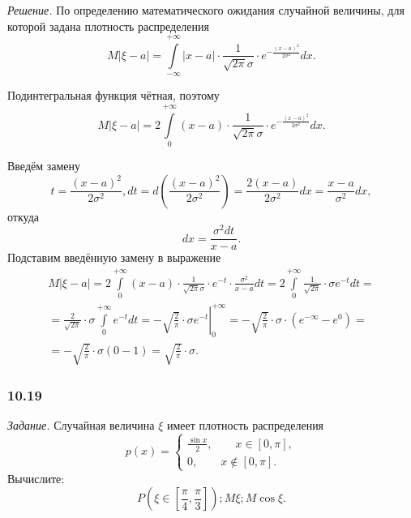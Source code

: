 \textit{Решение.} По определению математического ожидания случайной величины, для которой задана плотность распределения
$$M \left| \xi - a \right| =
\int \limits_{- \infty }^{+ \infty } \left| x - a \right| \cdot \frac{1}{ \sqrt{2 \pi } \sigma } \cdot e^{- \frac{ \left( x - a \right)^2}{2 \sigma^2}} dx.$$

Подинтегральная функция чётная, поэтому
$$M \left| \xi - a \right| =
2 \int \limits_0^{+ \infty } \left( x - a \right) \cdot \frac{1}{ \sqrt{2 \pi } \sigma } \cdot e^{- \frac{ \left( x - a \right)^2}{2 \sigma^2}} dx.$$

Введём замену
$$t = \frac{ \left( x-a \right)^2}{2 \sigma^2},
dt = d \left( \frac{ \left( x-a \right)^2}{2 \sigma^2} \right) = \frac{2 \left( x-a \right) }{2 \sigma^2} dx = \frac{x-a}{ \sigma^2} dx,$$
откуда
$$dx = \frac{ \sigma^2 dt}{x-a}.$$
Подставим введённую замену в выражение
\begin{equation*}
\begin{split}
M \left| \xi - a \right| =
2 \int \limits_0^{+ \infty } \left( x-a \right) \cdot \frac{1}{ \sqrt{2 \pi } \sigma } \cdot e^{-t} \cdot \frac{ \sigma^2}{x-a} dt =
2 \int \limits_0^{+ \infty } \frac{1}{ \sqrt{2 \pi }} \cdot \sigma e^{-t} dt = \\
= \frac{2}{ \sqrt{2 \pi }} \cdot \sigma \int \limits_0^{+ \infty } e^{-t} dt =
\left. - \sqrt{ \frac{2}{ \pi }} \cdot \sigma e^{-t} \right|_0^{+ \infty } =
- \sqrt{ \frac{2}{ \pi }} \cdot \sigma \cdot \left( e^{- \infty } - e^0 \right) = \\
= - \sqrt{ \frac{2}{ \pi }} \cdot \sigma \left( 0 - 1 \right) =
\sqrt{ \frac{2}{ \pi }} \cdot \sigma.
\end{split}
\end{equation*}

\subsubsection*{10.19}

\textit{Задание.} Случайная величина $ \xi $ имеет плотность распределения
$$p \left( x \right) =
\begin{cases}
\frac{ \sin x}{2}, \qquad x \in \left[ 0, \pi \right], \\
0, \qquad x \notin \left[ 0, \pi \right].
\end{cases}$$
Вычислите:
$$P \left( \xi \in \left[ \frac{ \pi }{4}, \frac{ \pi }{3} \right] \right);
M \xi;
M \cos \xi.$$

